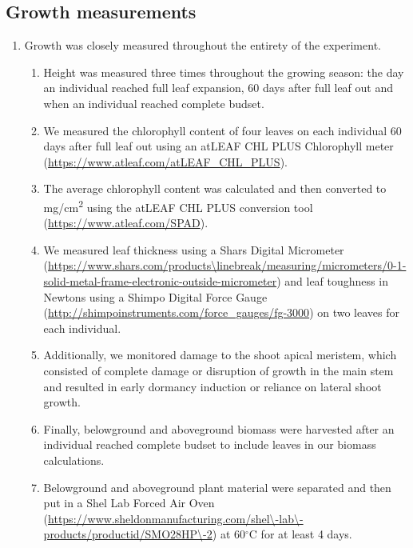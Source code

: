 \documentclass{article}\usepackage[]{graphicx}\usepackage[]{color}
\begin{document}
\subsection*{Growth measurements}
\begin{enumerate}
\item Growth was closely measured throughout the entirety of the experiment. 
  \begin{enumerate}
  \item Height was measured three times throughout the growing season: the day an individual reached full leaf expansion, 60 days after full leaf out and when an individual reached complete budset. 
  \item We measured the chlorophyll content of four leaves on each individual 60 days after full leaf out using an atLEAF CHL PLUS Chlorophyll meter (\url{https://www.atleaf.com/atLEAF\_CHL\_PLUS}).
  \item The average chlorophyll content was calculated and then converted to mg/cm\textsuperscript{2} using the atLEAF CHL PLUS conversion tool (\url{https://www.atleaf.com/SPAD}).
  \item We measured leaf thickness using a Shars Digital Micrometer (\url{https://www.shars.com/products\linebreak/measuring/micrometers/0-1-solid-metal-frame-electronic-outside-micrometer}) and leaf toughness in Newtons using a Shimpo Digital Force Gauge (\url{http://shimpoinstruments.com/force\_gauges/fg-3000}) on two leaves for each individual.
  \item Additionally, we monitored damage to the shoot apical meristem, which consisted of complete damage or disruption of growth in the main stem and resulted in early dormancy induction or reliance on lateral shoot growth.
  \item Finally, belowground and aboveground biomass were harvested after an individual reached complete budset to include leaves in our biomass calculations. 
  \item Belowground and aboveground plant material were separated and then put in a Shel Lab Forced Air Oven (\url{https://www.sheldonmanufacturing.com/shel\-lab\-products/productid/SMO28HP\-2}) at 60$^{\circ}$C for at least 4 days. 
  \end{enumerate}
\end{enumerate}
\end{document}
